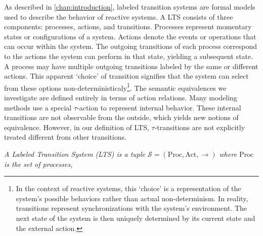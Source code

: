 %
\begin{isabellebody}%
%
%
\isadelimtheory
%
\endisadelimtheory
%
\isatagtheory
%
\endisatagtheory
{\isafoldtheory}%
%
\isadelimtheory
%
\endisadelimtheory
%
\isadelimdocument
%
\endisadelimdocument
%
\isatagdocument
%
\isamarkuptrue%
%
\endisatagdocument
{\isafolddocument}%
%
\isadelimdocument
%
\endisadelimdocument
%
\begin{isamarkuptext}%
\label{sec:LTS}%
\end{isamarkuptext}\isamarkuptrue%
%
\begin{isamarkuptext}%
As described in \cref{chap:introduction}, labeled transition systems are formal models used to describe the behavior of reactive systems.
A LTS consists of three components: processes, actions, and transitions. Processes represent momentary states or configurations of a system. 
Actions denote the events or operations that can occur within the system. The outgoing transitions of each process 
correspond to the actions the system can perform in that state, yielding a subsequent state. A process may have multiple outgoing transitions labeled by the same or different actions. This apparent `choice' of transition signifies that the system can select from these options non-deterministicaly\footnote{In the context of reactive systems, this `choice' is a representation of the system's possible behaviors rather than actual non-determinism. In reality, transitions represent synchronizations with the system's environment. The next state of the system is then uniquely determined by its current state and the external action.}.
The semantic equivalences we investigate are defined entirely in terms of action relations. Many modeling methods use a special $\tau$-action to represent internal behavior. These internal transitions are not observable from the outside, which yields new notions of equivalence. However, in our definition of LTS, 
$\tau$-transitions are not explicitly treated different from other transitions.%
\end{isamarkuptext}\isamarkuptrue%
%
\isadelimdocument
%
\endisadelimdocument
%
\isatagdocument
%
\isamarkuptrue%
%
\endisatagdocument
{\isafolddocument}%
%
\isadelimdocument
%
\endisadelimdocument
%
\begin{isamarkuptext}%
\textit{A \textnormal{Labeled Transition System (LTS)} is a tuple $\mathcal{S} = (\text{Proc}, \text{Act}, \rightarrow)$ where $\text{Proc}$ is the set of processes, 
}
\end{isamarkuptext}
\end{isabellebody}
